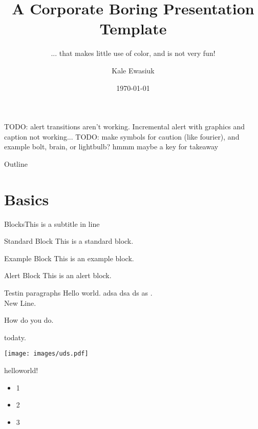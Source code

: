 \documentclass{\FormatDir corpborepresMulti}
\author{Kale Ewasiuk}
\title{A Corporate Boring Presentation\\Template}
\subtitle{... that makes little use of color, and is not very fun!}
\institute{Grid Infrastructure Planning Dept.}
\date{\today}
\begin{document}
	\begin{frame}[plain]
		TODO: alert transitions aren't working.
		Incremental alert with graphics and caption not working...
		TODO: make symbols for caution (like fourier), and example bolt, brain, or lightbulb? hmmm maybe a key for takeaway
	\end{frame}


	\begin{frame}[plain]
		\titlepage
	\end{frame}

	\begin{frame}{Outline}
		\tableofcontents
	\end{frame}

	\section{Basics}

	\subtitleINline
	\begin{frame}{Blocks}{This is a subtitle in line}

		\begin{block}{Standard Block}
			This is a standard block. 
		\end{block}

		\begin{exampleblock}{Example Block}
			This is an example block.
		\end{exampleblock}

		\begin{alertblock}{\Llap{\danger\ }Alert Block}
			This is an alert block.
		\end{alertblock}
	\end{frame}
	\subtitleNEWline
	\begin{frame}{Testin paragraphs}
		Hello world. adsa dsa ds as .\\New Line.

		How do you do.

		todaty.
	\end{frame}

\begin{frame}
		\texttt{[image: images/uds.pdf]}
\end{frame}


\begin{frame}
 	\begColFF
		hello\hfill world!
	\nextCol
	\begin{itemize}
            \item 1
            \item 2
            \item 3
         \end{itemize}
	\endCol
\end{frame}
\end{document}
